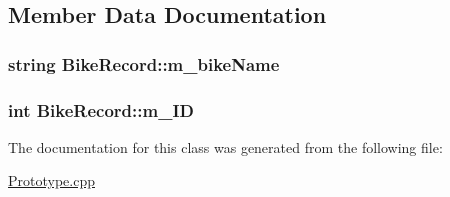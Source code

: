 \subsection{Member Data Documentation}
\subsubsection[{\texorpdfstring{m\+\_\+bike\+Name}{m_bikeName}}]{\setlength{\rightskip}{0pt plus 5cm}string Bike\+Record\+::m\+\_\+bike\+Name\hspace{0.3cm}{\ttfamily [private]}}\hypertarget{classBikeRecord_a5d1749281f51f57f778d11873beb8fdd}{}\label{classBikeRecord_a5d1749281f51f57f778d11873beb8fdd}
\subsubsection[{\texorpdfstring{m\+\_\+\+ID}{m_ID}}]{\setlength{\rightskip}{0pt plus 5cm}int Bike\+Record\+::m\+\_\+\+ID\hspace{0.3cm}{\ttfamily [private]}}\hypertarget{classBikeRecord_a1539b267352308b9ac0a97c54291aafd}{}\label{classBikeRecord_a1539b267352308b9ac0a97c54291aafd}


The documentation for this class was generated from the following file\+:\begin{DoxyCompactItemize}
\item 
\hyperlink{Prototype_8cpp}{Prototype.\+cpp}\end{DoxyCompactItemize}
